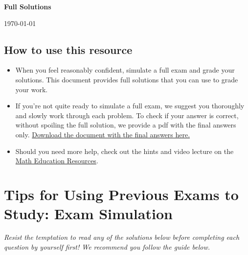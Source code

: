 \thispagestyle{empty}

\vspace{-1.7cm}

\begin{center}
{\huge \bf Full Solutions \\[0.3cm] \course \exam}
\end{center}
\begin{flushright}\today\end{flushright}

\vspace{-0.8cm}

\subsection{How to use this resource}

\begin{itemize}
\item When you feel reasonably confident, simulate a full exam and grade your solutions. This document provides full solutions that you can use to grade your work.
\item If you're not quite ready to simulate a full exam, we suggest you thoroughly and slowly work through each problem. To check if your answer is correct, without spoiling the full solution, we provide a pdf with the final answers only. \href{http://matheducationresources.github.io/pdf_version/}{Download the document with the final answers here.}
\item Should you need more help, check out the hints and video lecture on the \href{http://www.math-education-resources.com}{Math Education Resources}.
\end{itemize}


\section{Tips for Using Previous Exams to Study: Exam Simulation}

\emph{Resist the temptation to read any of the solutions below before completing each question by yourself first! We recommend you follow the guide below.}

